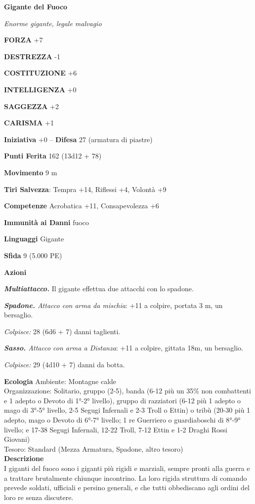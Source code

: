 \begin{multicols}{2}
\medskip{}\textbf{Gigante del Fuoco}

\emph{Enorme gigante, legale malvagio}

\textbf{FORZA} +7

\textbf{DESTREZZA} -1

\textbf{COSTITUZIONE} +6

\textbf{INTELLIGENZA} +0

\textbf{SAGGEZZA} +2

\textbf{CARISMA} +1

\textbf{Iniziativa} +0 -- \textbf{Difesa} 27 (armatura di piastre)

\textbf{Punti Ferita} 162 (13d12 + 78)

\textbf{Movimento} 9 m

\textbf{Tiri Salvezza}: Tempra +14, Riflessi +4, Volontà +9

\textbf{Competenze} Acrobatica +11, Consapevolezza +6

\textbf{Immunità ai Danni} fuoco

\textbf{Linguaggi} Gigante

\textbf{Sfida} 9 (5.000 PE)

\textbf{Azioni}

\emph{\textbf{Multiattacco.}} Il gigante effettua due attacchi con lo spadone.

\emph{\textbf{Spadone.} Attacco con arma da mischia}: +11 a colpire, portata 3 m, un bersaglio.

\emph{Colpisce:} 28 (6d6 + 7) danni taglienti.

\emph{\textbf{Sasso.} Attacco con arma a Distanza}: +11 a colpire, gittata 18m, un bersaglio.

\emph{Colpisce:} 29 (4d10 + 7) danni da botta.

\textbf{Ecologia}
Ambiente: Montagne calde\\
Organizzazione: Solitario, gruppo (2-5), banda (6-12 più un 35\% non combattenti e 1 adepto o Devoto di 1°-2° livello), gruppo di razziatori (6-12 più 1 adepto o mago di 3°-5° livello, 2-5 Segugi Infernali e 2-3 Troll o Ettin) o tribù (20-30 più 1 adepto, mago o Devoto di 6°-7° livello; 1 re Guerriero o guardiaboschi di 8°-9° livello; e 17-38 Segugi Infernali, 12-22 Troll, 7-12 Ettin e 1-2 Draghi Rossi Giovani)\\
Tesoro: Standard (Mezza Armatura, Spadone, altro tesoro)\\
\textbf{Descrizione}\\
I giganti del fuoco sono i giganti più rigidi e marziali, sempre pronti alla guerra e a trattare brutalmente chiunque incontrino. La loro rigida struttura di comando prevede soldati, ufficiali e persino generali, e che tutti obbediscano agli ordini del loro re senza discutere.\\


\end{multicols}
